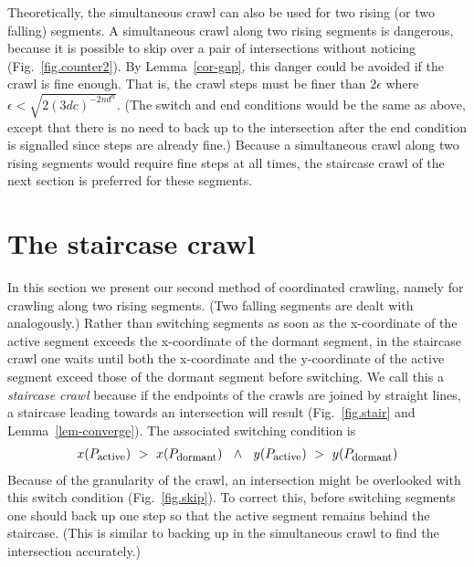 Theoretically, the simultaneous crawl can also be used for two rising (or two falling) segments.
A simultaneous crawl along two rising segments is dangerous, 
because it is possible to skip over a pair of intersections without noticing 
(Fig.~\ref{fig.counter2}).
By Lemma~\ref{cor-gap}, this danger could be avoided if the crawl is fine enough.
That is, the crawl steps must be finer than $2\epsilon$ where 
$\epsilon < \sqrt{2 (3dc)^{-2nd^{n}}}$.
(The switch and end conditions would be the same as above, except that there is no need to 
back up to the intersection after the end condition is signalled since steps are already fine.)
Because a simultaneous crawl along two rising segments would require fine steps at all times, 
the staircase crawl of the next section is preferred for these segments.


\section{The staircase crawl}
\label{sec-stair}

In this section we present our second method of coordinated crawling, namely for crawling
along two rising segments.
(Two falling segments are dealt with analogously.)
Rather than switching segments as soon as the x-coordinate of the active segment exceeds
the x-coordinate of the dormant segment,
in the staircase crawl one waits until both the x-coordinate and the y-coordinate of the active
segment exceed those of the dormant segment before switching.
We call this a {\em staircase crawl} because if the 
endpoints of the crawls are joined by straight lines, a staircase leading towards an intersection
will result (Fig.~\ref{fig.stair} and Lemma~\ref{lem-converge}).
The associated switching condition is
\begin{eqnarray*}
	x(P_{\mbox{\footnotesize{active}}}) \  > \ 
	x(P_{\mbox{\footnotesize{dormant}}}) \ \ \wedge \ \ 
	y(P_{\mbox{\footnotesize{active}}}) \ > \ 
	y(P_{\mbox{\footnotesize{dormant}}})
\end{eqnarray*}
Because of the granularity of the crawl, an intersection might be overlooked with this switch
condition (Fig.~\ref{fig.skip}).
To correct this, before switching segments one should back up one step so that the active 
segment remains behind the staircase.
(This is similar to backing up in the simultaneous crawl to find the intersection accurately.)

